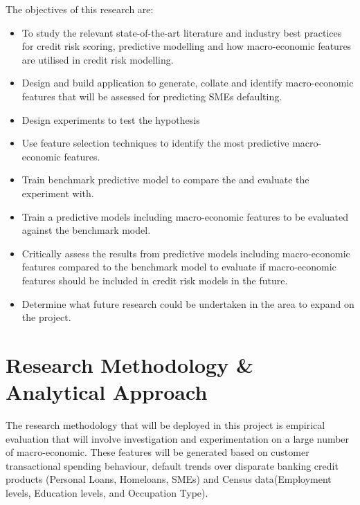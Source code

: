  
The objectives of this research are:

\begin{itemize}
	\item To study the relevant state-of-the-art literature and industry best practices for credit risk scoring, predictive modelling and how macro-economic features are utilised in credit risk modelling.
	
	\item Design and build application to generate, collate and identify macro-economic features that will be assessed for predicting SMEs defaulting.
	
	\item Design experiments to test the hypothesis
	
	\item Use feature selection techniques to identify the most predictive  macro-economic features.
	
	\item Train benchmark predictive model to compare the and evaluate the experiment with.
	
	\item Train a predictive models including macro-economic features to be evaluated against the benchmark model.

	\item Critically assess the results from predictive models including macro-economic features compared to the benchmark model to evaluate if macro-economic features should be included in credit risk models in the future.

	\item Determine what future research could be undertaken in the area to expand on the project.
\end{itemize}
	

\section{Research Methodology \& Analytical Approach}

The research methodology that will be deployed in this project is empirical evaluation that will involve investigation and experimentation on a large number of macro-economic. These features will be generated based on customer transactional spending behaviour, default trends over disparate banking credit products (Personal Loans, Homeloans, SMEs) and Census data(Employment levels, Education levels, and Occupation Type).   

